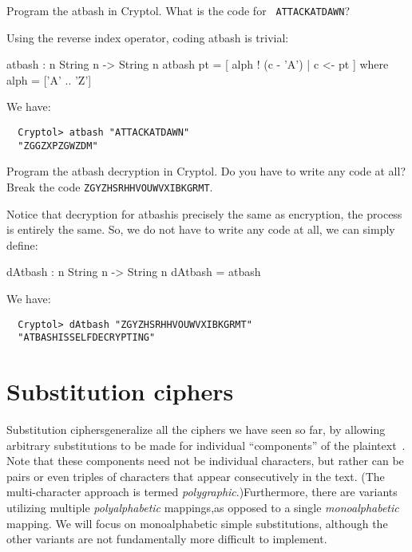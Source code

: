 \begin{Exercise}\label{ex:atbash:0}
  Program the atbash in Cryptol. What is the code for {\tt
    ATTACKATDAWN}?
\end{Exercise}
\begin{Answer}
  Using the reverse index operator, coding atbash is
  trivial:\indRIndex\indAtbash
\begin{code}
  atbash : {n} String n -> String n
  atbash pt = [ alph ! (c - 'A') | c <- pt ]
      where alph = ['A' .. 'Z']
\end{code}
We have:
\begin{Verbatim}
  Cryptol> atbash "ATTACKATDAWN"
  "ZGGZXPZGWZDM"
\end{Verbatim}
\end{Answer}

\begin{Exercise}\label{ex:atbash:1}
  Program the atbash decryption in Cryptol. Do you have to write any
  code at all? Break the code {\tt ZGYZHSRHHVOUWVXIBKGRMT}.
\end{Exercise}
\begin{Answer}
  Notice that decryption for atbash\indAtbash is precisely the same as
  encryption, the process is entirely the same. So, we do not have to
  write any code at all, we can simply define:
\begin{code}
  dAtbash : {n} String n -> String n
  dAtbash = atbash
\end{code}
We have:
\begin{Verbatim}
  Cryptol> dAtbash "ZGYZHSRHHVOUWVXIBKGRMT"
  "ATBASHISSELFDECRYPTING"
\end{Verbatim}
\end{Answer}

\section{Substitution ciphers}
\label{section:subst}

Substitution ciphers\indSubstitutioncipher generalize all the ciphers
we have seen so far, by allowing arbitrary substitutions to be made
for individual ``components'' of the
plaintext~\cite{wiki:substitution}.  Note that these components need
not be individual characters, but rather can be pairs or even triples
of characters that appear consecutively in the text. (The
multi-character approach is termed {\em
  polygraphic}.)\indPolyGraphSubst Furthermore, there are variants
utilizing multiple {\em polyalphabetic} mappings,\indPolyAlphSubst as
opposed to a single {\em monoalphabetic} mapping\indMonoAlphSubst.  We
will focus on monoalphabetic simple substitutions, although the other
variants are not fundamentally more difficult to implement.

